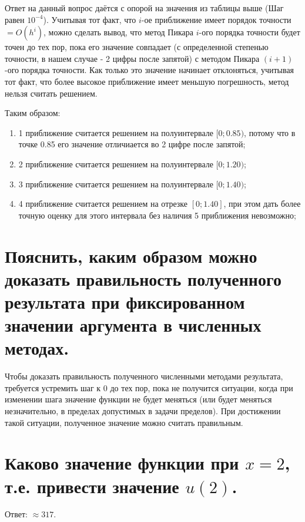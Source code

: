 Ответ на данный вопрос даётся с опорой на значения из таблицы выше (Шаг равен $10^{-4}$). Учитывая тот факт, что $i$-ое приближение имеет порядок точности $= O(h^{i})$, можно сделать вывод, что метод Пикара $i$-ого порядка точности будет точен до тех пор, пока его значение совпадает (с определенной степенью точности, в нашем случае - 2 цифры после запятой) с методом Пикара $(i+1)$-ого порядка точности. Как только это значение начинает отклоняться, учитывая тот факт, что более высокое приближение имеет меньшую погрешность, метод нельзя считать решением.

Таким образом:
\begin{enumerate}
    \item 1 приближение считается решением на полуинтервале $[0; 0.85)$, потому что в точке 0.85 его значение отличиается во 2 цифре после запятой;
    \item 2 приближение считается решением на полуинтервале $[0; 1.20)$;
    \item 3 приближение считается решением на полуинтервале $[0; 1.40)$;
    \item 4 приближение считается решением на отрезке $[0; 1.40]$, при этом дать более точную оценку для этого интервала без наличия 5 приближения невозможно;
\end{enumerate}

\section{Пояснить, каким образом можно доказать правильность полученного результата при фиксированном значении аргумента в численных методах.}

Чтобы доказать правильность полученного численными методами результата, требуется устремить шаг к 0 до тех пор, пока не получится ситуации, когда при изменении шага значение функции не будет меняться (или будет меняться незначительно, в пределах допустимых в задачи пределов). При достижении такой ситуации, полученное значение можно считать правильным.

\section{Каково значение функции при $x=2$, т.е. привести значение $u(2)$.}

Ответ: $\approx 317$.

